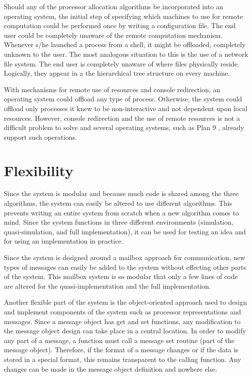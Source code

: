\documentclass{report}
\begin{document}
Should any of the processor allocation algorithms be incorporated into an
operating system, the initial step of specifying which machines to use for
remote computation could be performed once by writing a configuration file.
The end user could be completely unaware of the remote computation
mechanism.  Whenever s/he launched a process from a shell, it might be
offloaded, completely unknown to the user.  The most analogous situation to
this is the use of a network file system.  The end user is completely
unaware of where files physically reside.  Logically, they appear in a the
hierarchical tree structure on every machine.

With mechanisms for remote use of resources and console redirection, an
operating system could offload any type of process.  Otherwise, the system
could offload only processes it knew to be non-interactive and not dependent
upon local resources.  However, console redirection and the use of remote
resources is not a difficult problem to solve and several operating systems,
such as Plan 9 \cite{plan9}, already support such operations.


\section{Flexibility}

Since the system is modular and because much code is shared among the
three algorithms, the system can easily be altered to use different
algorithms.  This prevents writing an entire system from scratch when a new
algorithm comes to mind.  Since the system functions in three different
environments (simulation, quasi-simulation, and full implementation), it can
be used for testing an idea and for using an implementation in practice.

Since the system is designed around a mailbox approach for communication,
new types of messages can easily be added to the system without effecting
other parts of the system.  This mailbox system is so modular that only a
few lines of code are altered for the quasi-implementation and the full
implementation.

Another flexible part of the system is the object-oriented approach used to
design and implement components of the system such as processor
representations and messages.  Since a message object has get and set
functions, any modification to the message object design can take place in a
central location.  In order to modify any part of a message, a function must
call a message set routine (part of the message object).  Therefore, if the
format of a message changes or if the data is stored in a special format,
this remains transparent to the calling function.  Any changes can be made
in the message object definition and nowhere else.
\end{document}
